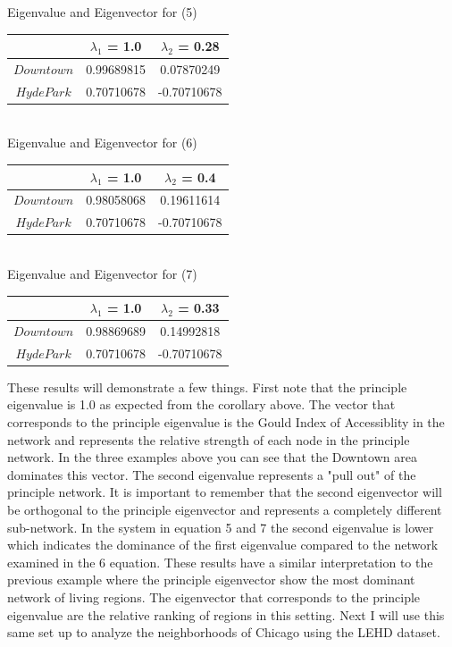 \documentclass{article}
\theoremstyle{definition}
\theoremstyle{remark}
\begin{document}
\begin{center}
Eigenvalue and Eigenvector for (5) \\
\begin{tabular}{||c | c c ||} 
 \hline
 & $\lambda_1$ = 1.0 & $\lambda_2$ = 0.28\\[0.5ex] 
 \hline\hline
 $Downtown$ & 0.99689815 & 0.07870249 \\
 $Hyde Park$ & 0.70710678 & -0.70710678  \\ 
 \hline
 \end{tabular} \\ 
Eigenvalue and Eigenvector for (6) \\
\begin{tabular}{||c | c c ||} 
 \hline
 & $\lambda_1$ = 1.0 & $\lambda_2$ = 0.4\\[0.5ex] 
 \hline\hline
 $Downtown$ & 0.98058068 & 0.19611614 \\
 $Hyde Park$ & 0.70710678 & -0.70710678  \\ 
 \hline
 \end{tabular} \\ 
Eigenvalue and Eigenvector for (7) \\
\begin{tabular}{||c | c c ||} 
 \hline
 & $\lambda_1$ = 1.0 & $\lambda_2$ = 0.33\\[0.5ex] 
 \hline\hline
 $Downtown$ & 0.98869689 & 0.14992818 \\
 $Hyde Park$ & 0.70710678 & -0.70710678  \\ 
 \hline
 \end{tabular}
 \end{center}

These results will demonstrate a few things.  First note that the principle eigenvalue is 1.0 as expected from the corollary above.  The vector that corresponds to the principle eigenvalue is the Gould Index of Accessiblity in the network and represents the relative strength of each node in the principle network.  In the three examples above you can see that the Downtown area dominates this vector.  The second eigenvalue represents a "pull out" of the principle network.  It is important to remember that the second eigenvector will be orthogonal to the principle eigenvector and represents a completely different sub-network.  In the system in equation 5 and 7 the second eigenvalue is lower which indicates the dominance of the first eigenvalue compared to the network examined in the 6 equation.  These results have a similar interpretation to the previous example where the principle eigenvector show the most dominant network of living regions.  The eigenvector that corresponds to the principle eigenvalue are the relative ranking of regions in this setting.  Next I will use this same set up to analyze the neighborhoods of Chicago using the LEHD dataset.
\end{document}

